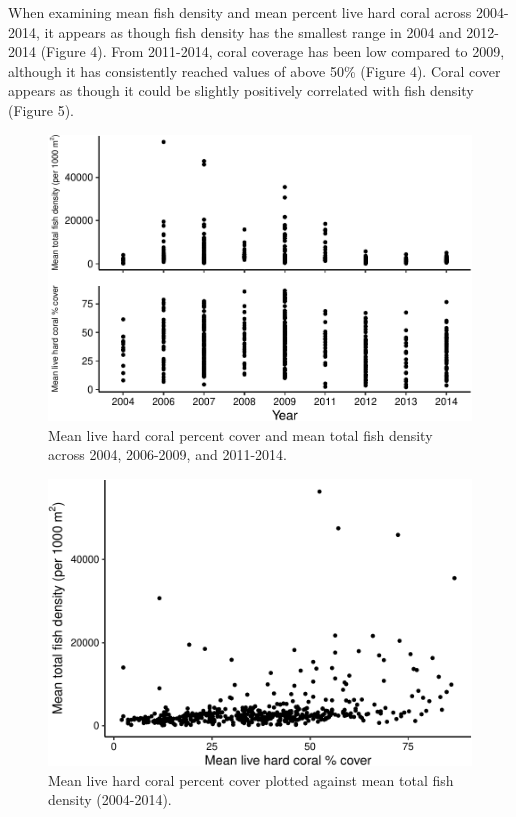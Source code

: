 \documentclass[12pt,]{article}
\begin{document}
When examining mean fish density and mean percent live hard coral across
2004-2014, it appears as though fish density has the smallest range in
2004 and 2012-2014 (Figure 4). From 2011-2014, coral coverage has been
low compared to 2009, although it has consistently reached values of
above 50\% (Figure 4). Coral cover appears as though it could be
slightly positively correlated with fish density (Figure 5).

\begin{figure}

{\centering \includegraphics{Mullaney_ENV872_Project_files/figure-latex/Coral Fish Exploratory Plots-1} 

}

\caption{Mean live hard coral percent cover and mean total fish density across 2004, 2006-2009, and 2011-2014.}\label{fig:Coral Fish Exploratory Plots}
\end{figure}

\begin{figure}

{\centering \includegraphics{Mullaney_ENV872_Project_files/figure-latex/Coral Fish Scatter-1} 

}

\caption{Mean live hard coral percent cover plotted against mean total fish density (2004-2014).}\label{fig:Coral Fish Scatter}
\end{figure}
\end{document}
